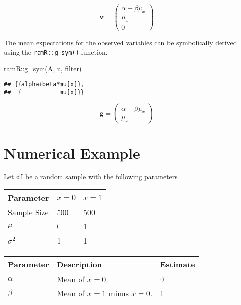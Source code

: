 \documentclass[
]{book}
\newenvironment{Shaded}{\begin{snugshade}}{\end{snugshade}}
\newcommand{\FunctionTok}[1]{\textcolor[rgb]{0.00,0.00,0.00}{#1}}
\newcommand{\NormalTok}[1]{#1}
\newcommand{\SpecialCharTok}[1]{\textcolor[rgb]{0.00,0.00,0.00}{#1}}
\theoremstyle{definition}
\theoremstyle{definition}
\theoremstyle{definition}
\theoremstyle{remark}
\begin{document}
\begin{equation*}\mathbf{v} =\left( \begin{array}{c} \alpha  + \beta  \mu  _{x} \\ \mu  _{x} \\ 0 \end{array} \right)\end{equation*}

The mean expectations for the observed variables
can be symbolically derived using the \texttt{ramR::g\_sym()} function.

\begin{Shaded}
\begin{Highlighting}[]
\NormalTok{ramR}\SpecialCharTok{::}\FunctionTok{g\_sym}\NormalTok{(A, u, filter)}
\end{Highlighting}
\end{Shaded}

\begin{verbatim}
## {{alpha+beta*mu[x]},
##  {           mu[x]}}
\end{verbatim}

\begin{equation*}\mathbf{g} =\left( \begin{array}{c} \alpha  + \beta  \mu  _{x} \\ \mu  _{x} \end{array} \right)\end{equation*}

\hypertarget{numerical-example}{%
\section{Numerical Example}\label{numerical-example}}

Let \texttt{df} be a random sample with the following parameters

\begin{tabular}{l|l|l}
\hline
Parameter & $x = 0$ & $x = 1$\\
\hline
Sample Size & 500 & 500\\
\hline
$\mu$ & 0 & 1\\
\hline
$\sigma^2$ & 1 & 1\\
\hline
\end{tabular}

\begin{tabular}{l|l|l}
\hline
Parameter & Description & Estimate\\
\hline
$\alpha$ & Mean of $x = 0$. & 0\\
\hline
$\beta$ & Mean of $x = 1$ minus $x = 0$. & 1\\
\hline
\end{tabular}
\end{document}
